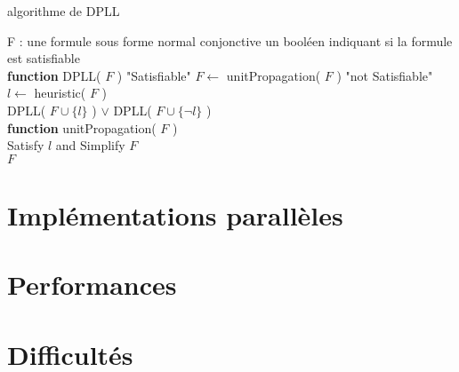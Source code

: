 \documentclass{beamer}
\newcommand{\cuda}{\textsc{CUDA}}
\begin{document}
\begin{algorithm}[h!]
\caption{algorithme de \textsc{DPLL}}\label{alg:DPLL}
\begin{algorithmic}
\REQUIRE F : une formule sous forme normal conjonctive
\ENSURE un booléen indiquant si la formule est satisfiable \\
\medskip
\textbf{function} DPLL( $F$ )
    \RETURN "Satisfiable"
  \ENDIF
  \STATE $F \gets$ unitPropagation( $F$ )
    \RETURN "not Satisfiable"
  \ENDIF
  \STATE $l \gets$ heuristic( $F$ ) \\
  \RETURN DPLL( $F \cup\{l\}$ ) $\vee$ DPLL( $F \cup \{\lnot l\}$ ) \\

\medskip
\textbf{function} unitPropagation( $F$ )\\
  Satisfy $l$ and Simplify $F$ \\
  \RETURN $F$
\ENDWHILE

\end{algorithmic}
\end{algorithm}





\section{Implémentations parallèles}

\section{Performances}

\section{Difficultés}
\end{document}
